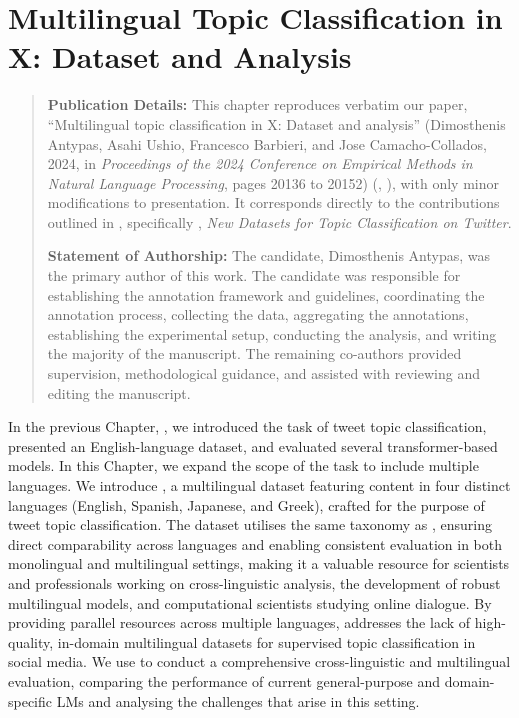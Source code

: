 \setlength{\headheight}{15pt}
\chapter{Multilingual Topic Classification in X: Dataset and Analysis}
\label{ch:x-topic}


\begin{quote}
\textbf{Publication Details:} This chapter reproduces verbatim our paper, ``Multilingual topic classification in X: Dataset and analysis'' (Dimosthenis Antypas, Asahi Ushio, Francesco Barbieri, and Jose Camacho-Collados, 2024, in \textit{Proceedings of the 2024 Conference on Empirical Methods in Natural Language Processing}, pages 20136 to 20152) (, ), with only minor modifications to presentation. It corresponds directly to the contributions outlined in , specifically , \textit{New Datasets for Topic Classification on Twitter}.

\textbf{Statement of Authorship:} The candidate, Dimosthenis Antypas, was the primary author of this work. The candidate was responsible for establishing the annotation framework and guidelines, coordinating the annotation process, collecting the data, aggregating the annotations, establishing the experimental setup, conducting the analysis, and writing the majority of the manuscript. The remaining co-authors provided supervision, methodological guidance, and assisted with reviewing and editing the manuscript.
\end{quote}

In the previous Chapter, , we introduced the task of tweet topic classification, presented an English-language dataset, and evaluated several transformer-based models. In this Chapter, we expand the scope of the task to include multiple languages. We introduce {\XTOPIC}, a multilingual dataset featuring content in four distinct languages (English, Spanish, Japanese, and Greek), crafted for the purpose of tweet topic classification. The dataset utilises the same taxonomy as {\TweetTopic}, ensuring direct comparability across languages and enabling consistent evaluation in both monolingual and multilingual settings, making it a valuable resource for scientists and professionals working on cross-linguistic analysis, the development of robust multilingual models, and computational scientists studying online dialogue. By providing parallel resources across multiple languages, {\XTOPIC} addresses the lack of high-quality, in-domain multilingual datasets for supervised topic classification in social media. We use {\XTOPIC} to conduct a comprehensive cross-linguistic and multilingual evaluation, comparing the performance of current general-purpose and domain-specific \acp{LM} and analysing the challenges that arise in this setting.

